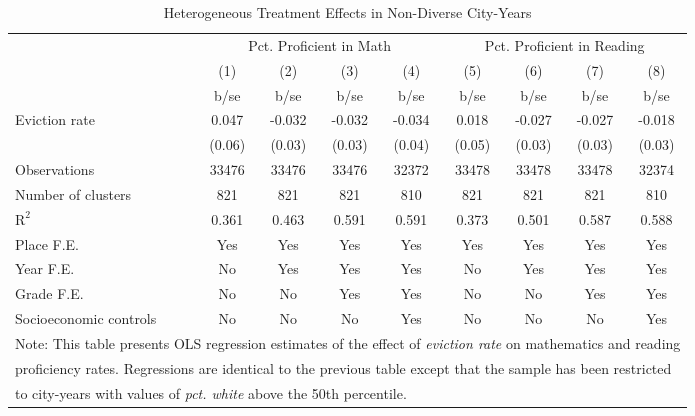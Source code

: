 \begin{table}[htbp]\centering
\def\sym#1{\ifmmode^{#1}\else\(^{#1}\)\fi}
\caption{Heterogeneous Treatment Effects in Non-Diverse City-Years}
\begin{tabular}{l*{8}{c}}
\toprule
                    &\multicolumn{4}{c}{Pct. Proficient in Math}        &\multicolumn{4}{c}{Pct. Proficient in Reading}     \\\cmidrule(lr){2-5}\cmidrule(lr){6-9}
                    &\multicolumn{1}{c}{(1)}&\multicolumn{1}{c}{(2)}&\multicolumn{1}{c}{(3)}&\multicolumn{1}{c}{(4)}&\multicolumn{1}{c}{(5)}&\multicolumn{1}{c}{(6)}&\multicolumn{1}{c}{(7)}&\multicolumn{1}{c}{(8)}\\
                    &        b/se&        b/se&        b/se&        b/se&        b/se&        b/se&        b/se&        b/se\\
\midrule
Eviction rate       &       0.047&      -0.032&      -0.032&      -0.034&       0.018&      -0.027&      -0.027&      -0.018\\
                    &      (0.06)&      (0.03)&      (0.03)&      (0.04)&      (0.05)&      (0.03)&      (0.03)&      (0.03)\\
\midrule
Observations        &       33476&       33476&       33476&       32372&       33478&       33478&       33478&       32374\\
Number of clusters  &         821&         821&         821&         810&         821&         821&         821&         810\\
$\text{R}^2$        &       0.361&       0.463&       0.591&       0.591&       0.373&       0.501&       0.587&       0.588\\
Place F.E.          &         Yes&         Yes&         Yes&         Yes&         Yes&         Yes&         Yes&         Yes\\
Year F.E.           &          No&         Yes&         Yes&         Yes&          No&         Yes&         Yes&         Yes\\
Grade F.E.          &          No&          No&         Yes&         Yes&          No&          No&         Yes&         Yes\\
Socioeconomic controls&          No&          No&          No&         Yes&          No&          No&          No&         Yes\\
\bottomrule
\multicolumn{9}{l}{\footnotesize Note: This table presents OLS regression estimates of the effect of \emph{eviction rate} on mathematics and reading}\\
\multicolumn{9}{l}{\footnotesize proficiency rates. Regressions are identical to the previous table except that the sample has been restricted}\\
\multicolumn{9}{l}{\footnotesize to city-years with values of \emph{pct. white} above the 50th percentile.}\\
\end{tabular}
\end{table}
